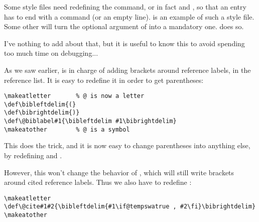 \begin{myex}
\end{myex}


\label{redefbibitem}


Some style files need redefining the  command, or in 
fact  and , so that an entry has to 
end with a  command (or an empty line).  is an
example of such a style file. Some other will turn the optional
argument of  into a mandatory one.  does
so. 

I've nothing to add about that, but it is useful to know this to 
avoid spending too much time on debugging...





As we saw earlier,  is in charge of adding brackets
around reference labels, in the reference list. It is easy 
to redefine it in order to get parentheses: 

\begin{verbatim}
\makeatletter		% @ is now a letter
\def\bibleftdelim{(}
\def\bibrightdelim{)}
\def\@biblabel#1{\bibleftdelim #1\bibrightdelim}
\makeatother		% @ is a symbol
\end{verbatim}

This does the trick, and it is now easy to change parentheses into
anything else, by redefining  and
. 

However, this won't change the behavior of , which will
still write brackets around cited reference labels. Thus we also have
to redefine :
\begin{verbatim}
\makeatletter
\def\@cite#1#2{\bibleftdelim{#1\if@tempswatrue , #2\fi}\bibrightdelim}
\makeatother
\end{verbatim}

